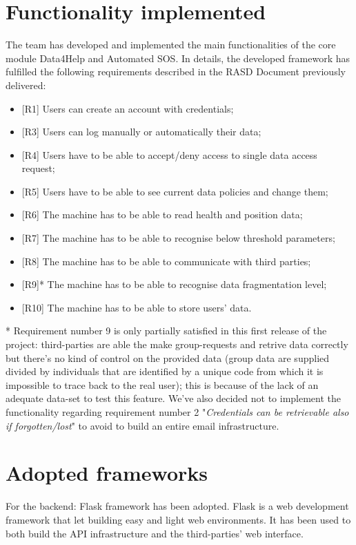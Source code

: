 \documentclass{article}
\begin{document}
\section{Functionality implemented}
The team has developed and implemented the main functionalities of the core module Data4Help and Automated SOS.
In details, the developed framework has fulfilled the following requirements described in the RASD Document previously delivered:
\begin{itemize}
	\item {[R1]} Users can create an account with credentials;
	\item {[R3]} Users can log manually or automatically their data;
	\item {[R4]} Users have to be able to accept/deny access to single data access request;
	\item {[R5]} Users have to be able to see current data policies and change them;
	\item {[R6]} The machine has to be able to read health and position data;
	\item {[R7]} The machine has to be able to recognise below threshold parameters;
	\item {[R8]} The machine has to be able to communicate with third parties;
	\item {[R9]}* The machine has to be able to recognise data fragmentation level;
	\item {[R10]} The machine has to be able to store users’ data.
\end{itemize}

* Requirement number 9 is only partially satisfied in this first release of the project: third-parties are able the make group-requests and retrive data correctly but there's no kind of control on the provided data (group data are supplied divided by individuals that are identified by a unique code from which it is impossible to trace back to the real user); this is because of the lack of an adequate data-set to test this feature. \newline
We've also decided not to implement the functionality regarding requirement number 2 "\textit{Credentials can be retrievable also if forgotten/lost}" to avoid to build an entire email infrastructure.

\newpage
\section{Adopted frameworks}
For the backend: Flask framework has been adopted. Flask is a web development framework that let building easy and light web environments. It has been used to both build the API infrastructure and the third-parties' web interface.
\end{document}
